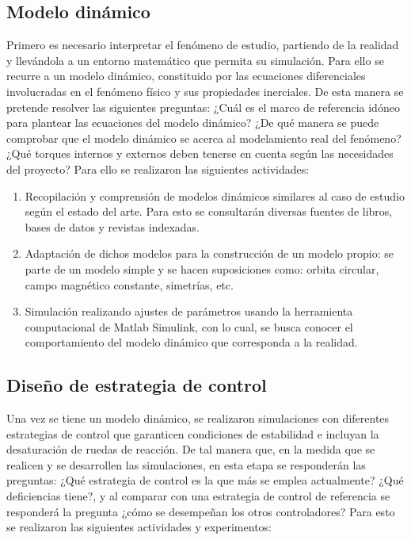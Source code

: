 \subsection{Modelo dinámico}\label{sub:modelo_din}
Primero es necesario interpretar el fenómeno de estudio, partiendo de la realidad y llevándola a un entorno matemático que permita su simulación. Para ello se recurre a un modelo dinámico, constituido por las ecuaciones diferenciales involucradas en el fenómeno físico y sus propiedades inerciales.
De esta manera se pretende resolver las siguientes preguntas: ¿Cuál es el marco de referencia idóneo para plantear las ecuaciones del modelo dinámico? ¿De qué manera se puede comprobar que el modelo dinámico se acerca al modelamiento real del fenómeno? ¿Qué torques internos y externos deben tenerse en cuenta según las necesidades del proyecto?
Para ello se realizaron las siguientes actividades:
\begin{enumerate}[label=\alph*)]
	
	\item Recopilación y comprensión de modelos dinámicos similares al caso de estudio según el estado del arte. Para esto se consultarán diversas fuentes de libros, bases de datos y revistas indexadas.
	
	\item Adaptación de dichos modelos para la construcción de un modelo propio: se parte de un modelo simple y se hacen suposiciones como: orbita circular, campo magnético constante, simetrías, etc.
	
	\item Simulación realizando ajustes de parámetros usando la herramienta computacional de Matlab Simulink, con lo cual, se busca conocer el comportamiento del modelo dinámico que corresponda a la realidad.

	
\end{enumerate}



\subsection{Diseño de estrategia de control} 
Una vez se tiene un modelo dinámico, se realizaron simulaciones con diferentes estrategias de control que garanticen condiciones de estabilidad e incluyan la desaturación de ruedas de reacción. 
De tal manera que, en la medida que se realicen y se desarrollen las simulaciones, en esta etapa se responderán las preguntas: ¿Qué estrategia de control es la que más se emplea actualmente? ¿Qué deficiencias tiene?, y al comparar con una estrategia de control de referencia se responderá la pregunta ¿cómo se desempeñan los otros controladores? Para esto se realizaron las siguientes actividades y experimentos:


